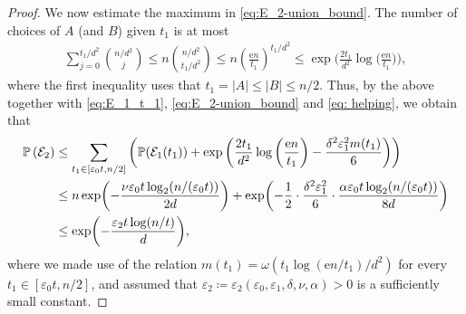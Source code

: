 \documentclass[reqno,final,a4paper]{amsart}
\theoremstyle{definition}
\newcommand{\cE}{\mathcal{E}}
\def\e{\mathrm{e}}
\def\eps{\varepsilon}
\newcommand{\1}{\mathbbm{1}}
\begin{document}
\begin{proof}
We now estimate the maximum in \eqref{eq:E_2-union_bound}. The number of choices of $A$ (and $B$) given $t_1$ is at most 
\begin{align*}
    \sum_{j=0}^{t_1/d^2}\binom{n/d^2}{j}\le n\binom{n/d^2}{t_1/d^2}\le n\left(\frac{\e n}{t_1}\right)^{t_1/d^2}\le \exp\bigg(\frac{2t_1}{d^2}\log\bigg(\frac{\e n}{t_1}\bigg)\bigg),
\end{align*}
where the first inequality uses that $t_1=|A|\le |B|\le n/2$. Thus, by the above together with \eqref{eq:E_1_t_1}, \eqref{eq:E_2-union_bound} and \eqref{eq: helping}, we obtain that
\begin{align}\label{eq: bounding ce2}
    \mathbb{P}\left(\cE_2\right)&\le  \sum_{t_1\in [\eps_0t,n/2]}\left(\mathbb P(\cE_1(t_1))+\exp\left(\frac{2t_1}{d^2}\log\bigg(\frac{\e n}{t_1}\bigg)-\frac{\delta^2\eps^2_1m(t_1)}{6}\right)\right)\notag\\
    &\le n\exp\biggl(-\frac{\nu\varepsilon_0 t \log_2(n/(\varepsilon_0 t))}{2d}\biggr)+\exp\biggl(-\frac{1}{2}\cdot \frac{\delta^2\eps^2_1}{6}\cdot \frac{\alpha \eps_0t\log_2(n/(\eps_0t))}{8d}\biggr)\nonumber\\
    &\le \exp\biggl(-\frac{\eps_2t\log(n/t)}{d}\biggr),
\end{align}
where we made use of the relation $m(t_1)=\omega(t_1\log(\e n/t_1)/d^2)$ for every $t_1\in [\eps_0t,n/2]$, and assumed that $\eps_2\coloneqq \eps_2(\eps_0,\eps_1,\delta,\nu,\alpha)>0$ is a sufficiently small constant.
\end{proof}
\end{document}
